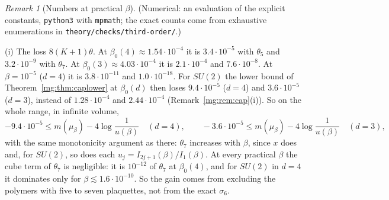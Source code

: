 \documentclass[11pt,a4paper]{article}
\theoremstyle{definition}
\theoremstyle{remark}
\newtheorem{remark}[theorem]{Remark}
\begin{document}
\begin{remark}[Numbers at practical $\beta$]\label{mg:rem:practical}
(Numerical: an evaluation of the explicit constants, \texttt{python3} with \texttt{mpmath}; the exact counts come from exhaustive enumerations in
\texttt{theory/checks/third-order/}.)

(i) The loss $8(K+1)\theta$. At $\beta_0(4)\approx1.54\cdot10^{-4}$ it is $3.4\cdot10^{-5}$ with $\theta_5$ and $3.2\cdot10^{-9}$ with $\theta_7$. At $\beta_0(3)\approx4.03\cdot10^{-4}$ it is
$2.1\cdot10^{-4}$ and $7.6\cdot10^{-8}$. At $\beta=10^{-5}$ ($d=4$) it is $3.8\cdot10^{-11}$ and $1.0\cdot10^{-18}$. For $SU(2)$ the lower bound of Theorem~\ref{mg:thm:caplower}
at $\beta_0(d)$ then loses $9.4\cdot10^{-5}$ ($d=4$) and $3.6\cdot10^{-5}$ ($d=3$), instead of $1.28\cdot10^{-4}$ and $2.44\cdot10^{-4}$ (Remark~\ref{mg:rem:cap}(i)). So on the whole range,
in infinite volume,
\[
-9.4\cdot10^{-5}\le m(\mu_\beta)-4\log\frac1{u(\beta)}\quad(d=4),\qquad -3.6\cdot10^{-5}\le m(\mu_\beta)-4\log\frac1{u(\beta)}\quad(d=3),
\]
with the same monotonicity argument as there: $\theta_7$ increases with $\beta$, since $x$ does and, for $SU(2)$, so does each $u_j=I_{2j+1}(\beta)/I_1(\beta)$. At every practical
$\beta$ the cube term of $\theta_7$ is negligible: it is $10^{-12}$ of $\theta_7$ at $\beta_0(4)$, and for $SU(2)$ in $d=4$ it dominates only for $\beta\lesssim1.6\cdot10^{-10}$. So the gain
comes from excluding the polymers with five to seven plaquettes, not from the exact $\sigma_6$.


\end{remark}
\end{document}
